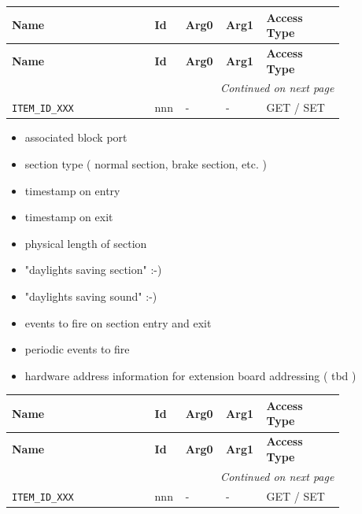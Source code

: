 \begin{longtable}{@{}|p{0.4\linewidth}|p{0.06\linewidth}|p{0.08\linewidth}|p{0.08\linewidth}|p{0.22\linewidth}|@{}}
    \toprule
    \textbf{Name} & \textbf{Id} & \textbf{Arg0} & \textbf{Arg1} & \textbf{Access Type} \\
    \midrule
    \midrule
    \endfirsthead
    \toprule
    \textbf{Name} & \textbf{Id} & \textbf{Arg0} & \textbf{Arg1} & \textbf{Access Type} \\
    \midrule
     \midrule
    \endhead
    \midrule
    \multicolumn{5}{r}{\textit{Continued on next page}} \\
    \midrule
    \endfoot
    \bottomrule
    \endlastfoot

    \texttt{ITEM\_ID\_XXX}       & nnn   & - & - & GET / SET \\
    \midrule
   
\end{longtable}


\begin{itemize}
\item associated block port
\item section type ( normal section, brake section, etc. )
\item timestamp on entry
\item timestamp on exit
\item physical length of section
\item "daylights saving section" :-)
\item "daylights saving sound" :-)
\item events to fire on section entry and exit
\item periodic events to fire
\item hardware address information for extension board addressing ( tbd )
\end{itemize}

\begin{longtable}{@{}|p{0.4\linewidth}|p{0.06\linewidth}|p{0.08\linewidth}|p{0.08\linewidth}|p{0.22\linewidth}|@{}}
    \toprule
    \textbf{Name} & \textbf{Id} & \textbf{Arg0} & \textbf{Arg1} & \textbf{Access Type} \\
    \midrule
    \midrule
    \endfirsthead
    \toprule
    \textbf{Name} & \textbf{Id} & \textbf{Arg0} & \textbf{Arg1} & \textbf{Access Type} \\
    \midrule
     \midrule
    \endhead
    \midrule
    \multicolumn{5}{r}{\textit{Continued on next page}} \\
    \midrule
    \endfoot
    \bottomrule
    \endlastfoot

    \texttt{ITEM\_ID\_XXX}       & nnn   & - & - & GET / SET \\
    \midrule
   
\end{longtable}

